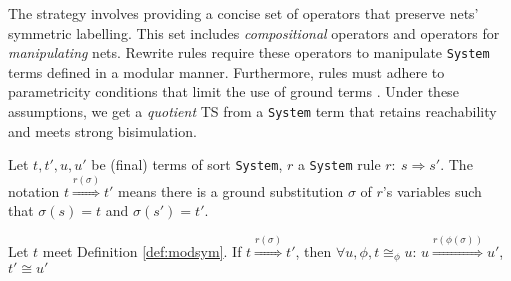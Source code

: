 The strategy involves providing a concise set of operators that preserve nets' symmetric labelling. This set includes \emph{compositional} operators %
and operators for \emph{manipulating} nets.
Rewrite rules require these operators to manipulate \verb|System| terms defined in a modular manner. 
Furthermore, rules must adhere to parametricity conditions that limit the use of ground terms \cite{CAPRA-TCS2024}.
Under these assumptions, we get a \emph{quotient} TS from a \verb|System|
term that
retains reachability and
meets strong bisimulation. 

Let $t,t',u,u'$ be (final) terms of sort \verb|System|, 
$r$ a \verb|System| rule $r : \ s \Rightarrow s'$. The notation $t \overset{r(\sigma)}{\Rightarrow} t'$
means there is a ground substitution $\sigma$ of $r$'s variables such that $\sigma(s) = t$ and $\sigma(s')= t'$.
\begin{property}
\label{prop:transition-corr}
Let
$t$ meet Definition \ref{def:modsym}.
If $t \overset{r(\sigma)}{\Rightarrow} t'$, then $\forall u, \phi, t \cong_{\phi} u$: $ u \overset{r(\phi(\sigma))}{\Rightarrow} u'$, $ t' \cong u'$ 
\end{property}

